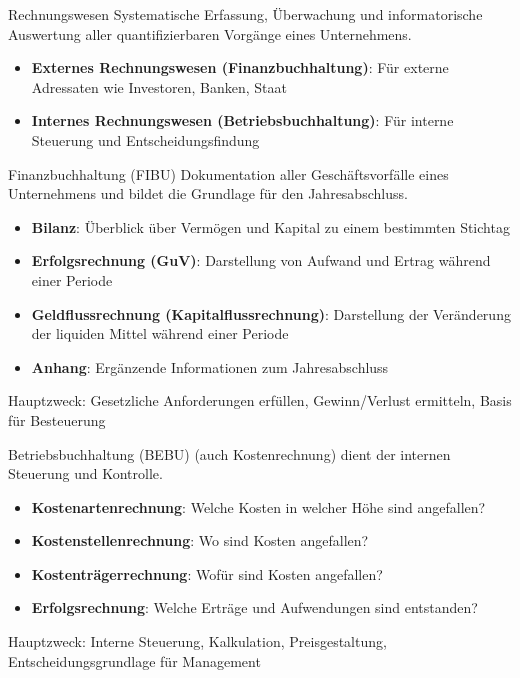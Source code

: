 \begin{definition}{Rechnungswesen}
    Systematische Erfassung, Überwachung und informatorische Auswertung aller quantifizierbaren Vorgänge eines Unternehmens.
\begin{itemize}
    \item \textbf{Externes Rechnungswesen (Finanzbuchhaltung)}: Für externe Adressaten wie Investoren, Banken, Staat
    \item \textbf{Internes Rechnungswesen (Betriebsbuchhaltung)}: Für interne Steuerung und Entscheidungsfindung
\end{itemize}
\end{definition}

\begin{concept}{Finanzbuchhaltung (FIBU)}
    Dokumentation aller Geschäftsvorfälle eines Unternehmens und bildet die Grundlage für den Jahresabschluss.
\begin{itemize}
    \item \textbf{Bilanz}: Überblick über Vermögen und Kapital zu einem bestimmten Stichtag
    \item \textbf{Erfolgsrechnung (GuV)}: Darstellung von Aufwand und Ertrag während einer Periode
    \item \textbf{Geldflussrechnung (Kapitalflussrechnung)}: Darstellung der Veränderung der liquiden Mittel während einer Periode
    \item \textbf{Anhang}: Ergänzende Informationen zum Jahresabschluss
\end{itemize}
Hauptzweck: Gesetzliche Anforderungen erfüllen, Gewinn/Verlust ermitteln, Basis für Besteuerung
\end{concept}

\begin{concept}{Betriebsbuchhaltung (BEBU)}
    (auch Kostenrechnung) dient der internen Steuerung und Kontrolle.
\begin{itemize}
    \item \textbf{Kostenartenrechnung}: Welche Kosten in welcher Höhe sind angefallen?
    \item \textbf{Kostenstellenrechnung}: Wo sind Kosten angefallen?
    \item \textbf{Kostenträgerrechnung}: Wofür sind Kosten angefallen?
    \item \textbf{Erfolgsrechnung}: Welche Erträge und Aufwendungen sind entstanden?
\end{itemize}
Hauptzweck: Interne Steuerung, Kalkulation, Preisgestaltung, Entscheidungsgrundlage für Management
\end{concept}

